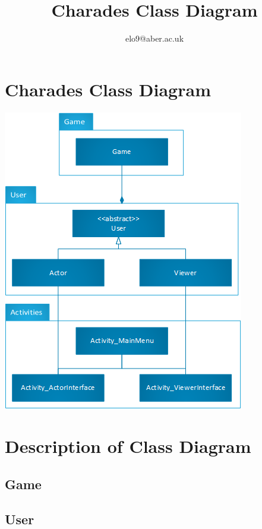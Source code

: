 \documentclass{article}
\title{Charades Class Diagram}
\author{elo9@aber.ac.uk}
\begin{document}
\maketitle
\tableofcontents

\newpage

\section{Charades Class Diagram}
\includegraphics[width=\textwidth]{CharadesClassImage}

\newpage


\section{Description of Class Diagram}
\subsection{Game}

\subsection{User}
\end{document}
